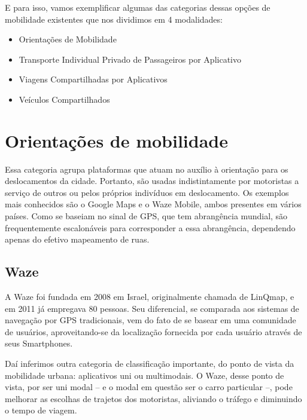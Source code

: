 E para isso, vamos exemplificar algumas das categorias dessas opções de mobilidade existentes que nos  dividimos em 4 modalidades:
\begin{itemize}
	\item Orientações de Mobilidade
	\item Transporte Individual Privado de Passageiros por Aplicativo
	\item Viagens Compartilhadas por Aplicativos
	\item Veículos Compartilhados
\end{itemize}

\section{Orientações de mobilidade}

Essa categoria agrupa plataformas que atuam no auxílio à orientação para os deslocamentos da cidade. Portanto, são usadas indistintamente por motoristas a serviço de outros ou pelos próprios indivíduos em deslocamento. Os exemplos mais conhecidos são o Google Maps e o Waze Mobile, ambos presentes em vários países. Como se baseiam no sinal de GPS, que tem
abrangência mundial, são frequentemente escalonáveis para corresponder a essa abrangência,
dependendo apenas do efetivo mapeamento de ruas. \cite{caronae}


\subsection{Waze}

A Waze foi fundada em 2008 em Israel, originalmente chamada de LinQmap, e em 2011 já
empregava 80 pessoas. Seu diferencial, se comparada aos sistemas de navegação por GPS tradicionais, vem do fato de se basear em uma comunidade de usuários, aproveitando-se da localização fornecida por cada usuário através de seus Smartphones. 

Daí inferimos outra categoria de classificação importante, do ponto de vista da mobilidade
urbana: aplicativos uni ou multimodais. O Waze, desse ponto de vista, por ser uni modal – e o modal em questão ser o carro particular –, pode melhorar as escolhas de trajetos dos motoristas, aliviando o tráfego e diminuindo o tempo de viagem.

